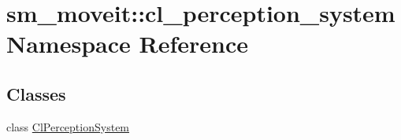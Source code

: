 \hypertarget{namespacesm__moveit_1_1cl__perception__system}{}\section{sm\+\_\+moveit\+:\+:cl\+\_\+perception\+\_\+system Namespace Reference}
\label{namespacesm__moveit_1_1cl__perception__system}
\subsection*{Classes}
\begin{DoxyCompactItemize}
\item 
class \hyperlink{classsm__moveit_1_1cl__perception__system_1_1ClPerceptionSystem}{Cl\+Perception\+System}
\end{DoxyCompactItemize}
